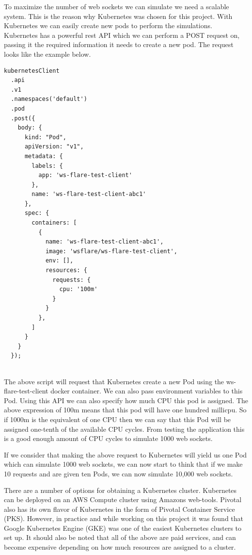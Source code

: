 To maximize the number of web sockets we can simulate we need a scalable system. This is the reason why Kubernetes was chosen for this project. With Kubernetes we can easily create new pods to perform the simulations. Kubernetes has a powerful rest API which we can perform a POST request on, passing it the required information it needs to create a new pod. The request looks like the example below.

\begin{verbatim}
kubernetesClient
  .api
  .v1
  .namespaces('default')
  .pod
  .post({
    body: {
      kind: "Pod",
      apiVersion: "v1",
      metadata: {
        labels: {
          app: 'ws-flare-test-client'
        },
        name: 'ws-flare-test-client-abc1'
      },
      spec: {
        containers: [
          {
            name: 'ws-flare-test-client-abc1',
            image: 'wsflare/ws-flare-test-client',
            env: [],
            resources: {
              requests: {
                cpu: '100m'
              }
            }
          },
        ]
      }
    }
  });
  
\end{verbatim}

The above script will request that Kubernetes create a new Pod using the ws-flare-test-client docker container. We can also pass environment variables to this Pod. Using this API we can also specify how much CPU this pod is assigned. The above expression of 100m means that this pod will have one hundred millicpu. So if 1000m is the equivalent of one CPU then we can say that this Pod will be assigned one-tenth of the available CPU cycles. From testing the application this is a good enough amount of CPU cycles to simulate 1000 web sockets. 

If we consider that making the above request to Kubernetes will yield us one Pod which can simulate 1000 web sockets, we can now start to think that if we make 10 requests and are given ten Pods, we can now simulate 10,000 web sockets.

There are a number of options for obtaining a Kubernetes cluster. Kubernetes can be deployed on an AWS Compute cluster using Amazons web-tools. Pivotal also has its own flavor of Kubernetes in the form of Pivotal Container Service (PKS). However, in practice and while working on this project it was found that Google Kubernetes Engine (GKE) was one of the easiest Kubernetes clusters to set up. It should also be noted that all of the above are paid services, and can become expensive depending on how much resources are assigned to a cluster. 

